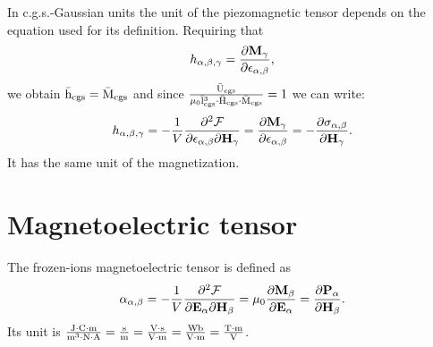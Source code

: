 \documentclass[12pt,a4paper,twoside]{report}
\begin{document}
{\color{orange} In c.g.s.-Gaussian units the unit of the piezomagnetic 
tensor depends on the equation used for its definition.
Requiring that
\begin{equation}
h_{\alpha,\beta,\gamma}={\partial {\bf M}_{\gamma} \over \partial 
\epsilon_{\alpha,\beta}},
\end{equation}
we obtain
${\rm \bar h_{cgs}}={\rm \bar M_{cgs}}$ and since 
${{\rm \bar U_{cgs}} \over \mu_0 {\rm \bar l_{cgs}}^3\cdot {\rm \bar H_{cgs}}
\cdot {\rm \bar M_{cgs}}}=
1$ we can write:
\begin{equation}
h_{\alpha,\beta,\gamma}=-{1\over V} 
{\partial^2 \mathcal{F} \over \partial 
\epsilon_{\alpha,\beta} \partial {\bf H}_{\gamma}}=
{\partial {\bf M}_{\gamma} \over \partial 
\epsilon_{\alpha,\beta}}=-
{\partial \sigma_{\alpha,\beta} \over \partial {\bf H}_{\gamma}}.
\end{equation}
It has the same unit of the magnetization.
}
\\

\newpage
{\color{coral}\section{Magnetoelectric tensor}}
\color{black}

The frozen-ions magnetoelectric tensor is defined as
\begin{equation}
\alpha_{\alpha,\beta}=-{1\over V} {\partial^2 \mathcal{F} \over \partial 
{\bf E}_{\alpha} \partial {\bf H}_{\beta}}=
\mu_0 {\partial {\bf M}_{\beta} \over \partial {\bf E}_{\alpha}}
={\partial {\bf P}_{\alpha} \over \partial {\bf H}_{\beta}}. 
\end{equation}
Its unit is ${{\rm J} \cdot {\rm C} \cdot {\rm m} \over {\rm m}^3 \cdot {\rm N} \cdot {\rm A}}={{\rm s} \over {\rm m}}=
{{\rm V} \cdot {\rm s} \over {\rm V}\cdot {\rm m}}= {{\rm Wb} \over {\rm V}\cdot {\rm m}} = {{\rm T} \cdot {\rm m} \over {\rm V}}$.
\\
\end{document}
